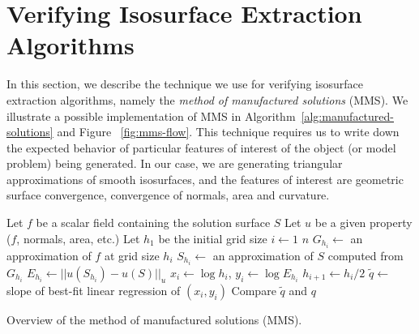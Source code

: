 \section{Verifying Isosurface Extraction Algorithms}
\label{chap1:sec:iea}

In this section, we describe the technique we use for verifying
isosurface extraction algorithms, namely the \emph{method of manufactured
solutions} (MMS). We illustrate a possible implementation of MMS in
Algorithm~\ref{alg:manufactured-solutions} and Figure ~\ref{fig:mms-flow}. This 
technique requires us to write down the expected behavior of particular 
features of interest of the object (or model problem) 
being generated. In our case, we are generating triangular
approximations of smooth isosurfaces, and the features of interest are
geometric surface convergence, convergence of normals, area and
curvature. 

\begin{algorithm}[h]
\begin{codebox}
\li \Comment Let $f$ be a scalar field containing the solution surface $S$
\li \Comment Let $u$ be a given property ($f$, normals, area, etc.)
\li \Comment Let $h_1$ be the initial grid size
\li \For $i \gets 1$ \To $n$
\li     \Do $G_{h_i} \gets $ an approximation of $f$ at grid size $h_i$
\li         $S_{h_i} \gets $ an approximation of $S$ computed from $G_{h_i}$
\li         $E_{h_i} \gets || u(S_{h_i}) - u(S)||_u$
\li         $x_i \gets \log h_i$, $y_i \gets \log E_{h_i}$
\li         $h_{i+1} \gets h_i / 2$
        \End
\li $\tilde{q} \gets $ slope of best-fit linear regression of $(x_i, y_i)$
\li Compare $\tilde{q}$ and $q$
\end{codebox}
\caption{\label{alg:manufactured-solutions}Overview of the method of manufactured solutions (MMS).}
\end{algorithm}

